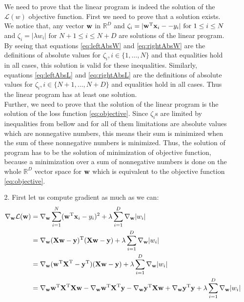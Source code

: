 \documentclass[10pt,a4paper]{article}
\begin{document}
\begin{enumerate}
\begin{enumerate}
We need to prove that the linear program is indeed the solution of the $\mathcal{L}(w)$ objective function. First we need to prove that a solution exists. We notice that, any vector $\textbf{\text{{w}}}$ in $\mathbb{R}^D$ and $\zeta_i=|\textbf{\text{{w}}} ^ \text{T}\textbf{\text{{x}}}_i - -y_i| \text{ for } 1 \leq i \leq N$ and $\zeta_i=|\lambda w_i| \text{ for } N + 1 \leq i \leq N + D $ are solutions of the linear program. By seeing that equations \ref{eq:leftAbsW}  and \ref{eq:rightAbsW} are the definitions of absolute values for $\zeta_i, i\in \{1, \ldots, N\}$ and that equalities hold in all cases, this solution is valid for these inequalities. Similarly, equations \ref{eq:leftAbsL} and \ref{eq:rightAbsL} are the definitions of absolute values for $\zeta_i, i\in \{N+1, \ldots, N+D\}$ and equalities hold in all cases. Thus the linear program has at least one solution. 
\\
Further, we need to prove that the solution of the linear program is the solution of the loss function \ref{eq:objective}. Since $\zeta_i$s are limited by inequalities from bellow and for all of them limitations are absolute values which are nonnegative numbers, this means their sum is minimized when the sum of these nonnegative numbers is minimized. Thus, the solution of program has to be the solution of minimization of objective function, because a minimization over a sum of nonnegative numbers is done on the whole $\mathbb{R}^D$ vector space for $\textbf{\text{{w}}}$ which is equivalent to the objective function \ref{eq:objective}. 
\item[2.] 
First let us compute gradient as much as we can:
\begin{align}
	\gradient{w} \mathcal{L}(\vect{w}) &= 
	\gradient{w} \sum_{i=1}^N(\transpose{\vect{w}}\vect{x}_i - y_i)^2 + \lambda\sum_{i=1}^D\gradient{w} |w_i| \label{eq:pass} \\
	&= \gradient{w} \transpose{(\mat{X}\vect{w} - \vect{y})}(\mat{X}\vect{w}-\vect{y})+\lambda \sum_{i=1}^D \gradient{w} |w_i| \label{eq:CompactForm}\\
	&= \gradient{w}(\transpose{\vect{w}}\transpose{\mat{X}} - \transpose{\vect{y}})(\mat{X}\vect{w}-\vect{y}) + \lambda \sum_{i=1}^D \gradient{w} |w_i| \label{eq:transpProp} \\
	&=\gradient{w} \transpose{\vect{w}}\transpose{\mat{X}}\mat{X}\vect{w}-\gradient{w}\transpose{\vect{w}}\transpose{\mat{X}}\vect{y}- \gradient{w} \transpose{\vect{y}}\mat{X}\vect{w} + \gradient{w}\transpose{\vect{y}}\vect{y} +  \lambda \sum_{i=1}^D \gradient{w} |w_i|\label{eq:simpleCalc}\\

\end{align}
\end{enumerate}
\end{enumerate}
\end{document}
